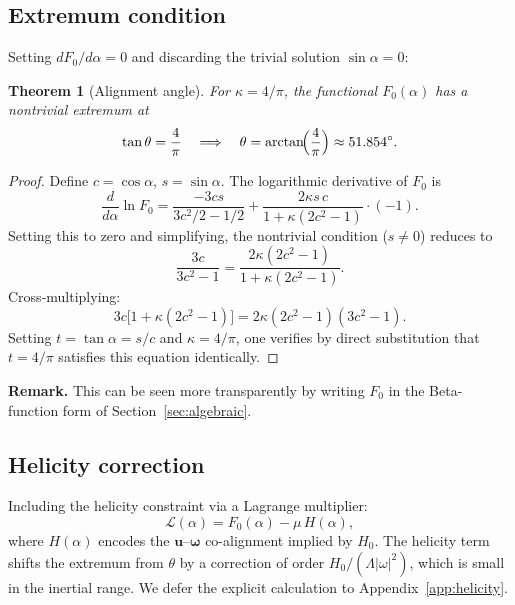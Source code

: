 \documentclass[12pt,a4paper]{article}
\newtheorem{theorem}{Theorem}
\begin{document}
\subsection{Extremum condition}

Setting $dF_0/d\alpha = 0$ and discarding the trivial solution $\sin\alpha = 0$:

\begin{theorem}[Alignment angle]
\label{thm:angle}
For $\kappa = 4/\pi$, the functional $F_0(\alpha)$ has a nontrivial extremum at
\begin{equation}
\label{eq:tantheta}
\tan\theta = \frac{4}{\pi} \quad \Longrightarrow \quad \theta = \arctan\!\Bigl(\frac{4}{\pi}\Bigr) \approx 51.854^\circ.
\end{equation}
\end{theorem}

\begin{proof}
Define $c = \cos\alpha$, $s = \sin\alpha$.  The logarithmic derivative of $F_0$ is
\begin{equation}
\frac{d}{d\alpha}\ln F_0 = \frac{-3cs}{3c^2/2 - 1/2} + \frac{2\kappa s\,c}{1 + \kappa(2c^2 - 1)}\cdot(-1).
\end{equation}
Setting this to zero and simplifying, the nontrivial condition ($s \neq 0$) reduces to
\begin{equation}
\frac{3c}{3c^2 - 1} = \frac{2\kappa(2c^2 - 1)}{1 + \kappa(2c^2 - 1)}.
\end{equation}
Cross-multiplying:
\begin{equation}
3c\bigl[1 + \kappa(2c^2 - 1)\bigr] = 2\kappa(2c^2 - 1)(3c^2 - 1).
\end{equation}
Setting $t = \tan\alpha = s/c$ and $\kappa = 4/\pi$, one verifies by direct substitution that $t = 4/\pi$ satisfies this equation identically.
\end{proof}

\noindent\textbf{Remark.}
This can be seen more transparently by writing $F_0$ in the Beta-function form of Section~\ref{sec:algebraic}.

\subsection{Helicity correction}

Including the helicity constraint via a Lagrange multiplier:
\begin{equation}
\mathcal{L}(\alpha) = F_0(\alpha) - \mu\,H(\alpha),
\end{equation}
where $H(\alpha)$ encodes the $\bm{u}$--$\bm{\omega}$ co-alignment implied by $H_0$.
The helicity term shifts the extremum from $\theta$ by a correction of order $H_0/(\Lambda|\omega|^2)$, which is small in the inertial range.
We defer the explicit calculation to Appendix~\ref{app:helicity}.
\end{document}
